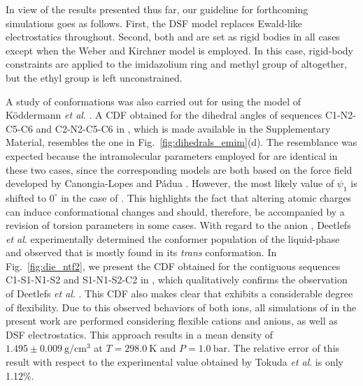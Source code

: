 \documentclass[3p,twocolumn]{elsarticle}
\begin{document}
In view of the results presented thus far, our guideline for forthcoming \ce{[emim][B(CN)_4]} simulations goes as follows.
First, the DSF model replaces Ewald-like electrostatics throughout.
Second, both \ce{[emim]^+} and \ce{[B(CN)_4]^-} are set as rigid bodies in all cases except when the Weber and Kirchner \cite{Weber_2016} model is employed.
In this case, rigid-body constraints are applied to the imidazolium ring and methyl group of \ce{[emim]^+} altogether, but the ethyl group is left unconstrained.

A study of conformations was also carried out for \ce{[emim][NTf_2]} using the model of K\"{o}ddermann \textit{et al}. \cite{Koddermann_2007}.
A CDF obtained for the dihedral angles of sequences C1-N2-C5-C6 and C2-N2-C5-C6 in \ce{[emim]^+}, which is made available in the Supplementary Material, resembles the one in Fig.~\ref{fig:dihedrals_emim}(d).
The resemblance was expected because the intramolecular parameters employed for \ce{[emim]^+} are identical in these two cases, since the corresponding models are both based on the force field developed by Canongia-Lopes and P\'{a}dua \cite{Canongia_Lopes_2006}.
However, the most likely value of $\psi_1$ is shifted to $0^{\circ}$ in the case of \ce{[emim][NTf_2]}.
This highlights the fact that altering atomic charges can induce conformational changes and should, therefore, be accompanied by a revision of torsion parameters in some cases.
With regard to the anion \ce{[NTf_2]^-}, Deetlefs \textit{et al}. \cite{Deetlefs_2006} experimentally determined the conformer population of the liquid-phase and observed that \ce{[NTf_2]^-} is mostly found in its \textit{trans} conformation.
In Fig.~\ref{fig:die_ntf2}, we present the CDF obtained for the contiguous sequences C1-S1-N1-S2 and S1-N1-S2-C2 in \ce{[NTf_2]^-}, which qualitatively confirms the observation of Deetlefs \textit{et al}. \cite{Deetlefs_2006}.
This CDF also makes clear that \ce{[NTf_2]^-} exhibits a considerable degree of flexibility.
Due to this observed behaviors of both ions, all simulations of \ce{[emim][NTf_2]} in the present work are performed considering flexible cations and anions, as well as DSF electrostatics.
This approach results in a mean density of $1.495 \pm 0.009 ~\mathrm{g/cm^3}$ at $T = 298.0~\mathrm{K}$ and $P = 1.0~\mathrm{bar}$.
The relative error of this result with respect to the experimental value obtained by Tokuda \textit{et al}. \cite{Tokuda_2005} is only 1.12\%.
\end{document}
